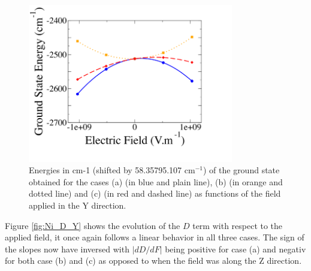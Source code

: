 \documentclass[10pt]{report}
\numberwithin{equation}{section}
\begin{document}
\begin{figure}[!h]
    \centering
    \includegraphics[width=0.8\textwidth]{Images/E_Y.png}
    \caption{Energies in cm-1 (shifted by 58.35795.107 cm$^{-1}$) of the ground state obtained for the cases (a) (in blue and plain line), (b)
    (in orange and dotted line) and (c) (in red and dashed line) as functions of the field applied in the Y direction.}
    \label{GSE_Y}
\end{figure}


Figure \ref{fig:Ni_D_Y} shows the evolution of the $D$ term with respect to the applied field, it once again follows a linear behavior in all three cases.
The sign of the slopes now have inversed with $|dD/dF|$ being positive for case (a) and negativ for both case (b) and (c) as opposed to when the field was along the Z direction.
\end{document}
